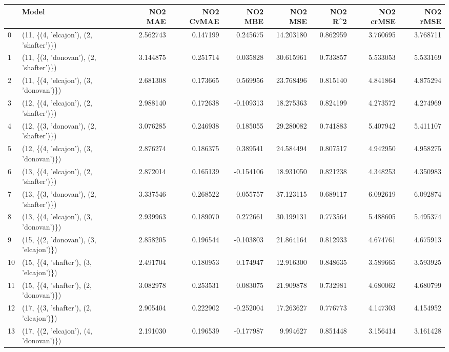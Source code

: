 \begin{tabular}{llrrrrrrr}
\toprule
{} &                                   Model &   NO2 MAE &  NO2 CvMAE &   NO2 MBE &    NO2 MSE &   NO2 R\textasciicircum2 &  NO2 crMSE &  NO2 rMSE \\
\midrule
0  &  (11, \{(4, 'elcajon'), (2, 'shafter')\}) &  2.562743 &   0.147199 &  0.245675 &  14.203180 &  0.862959 &   3.760695 &  3.768711 \\
1  &  (11, \{(3, 'donovan'), (2, 'shafter')\}) &  3.144875 &   0.251714 &  0.035828 &  30.615961 &  0.733857 &   5.533053 &  5.533169 \\
2  &  (11, \{(4, 'elcajon'), (3, 'donovan')\}) &  2.681308 &   0.173665 &  0.569956 &  23.768496 &  0.815140 &   4.841864 &  4.875294 \\
3  &  (12, \{(4, 'elcajon'), (2, 'shafter')\}) &  2.988140 &   0.172638 & -0.109313 &  18.275363 &  0.824199 &   4.273572 &  4.274969 \\
4  &  (12, \{(3, 'donovan'), (2, 'shafter')\}) &  3.076285 &   0.246938 &  0.185055 &  29.280082 &  0.741883 &   5.407942 &  5.411107 \\
5  &  (12, \{(4, 'elcajon'), (3, 'donovan')\}) &  2.876274 &   0.186375 &  0.389541 &  24.584494 &  0.807517 &   4.942950 &  4.958275 \\
6  &  (13, \{(4, 'elcajon'), (2, 'shafter')\}) &  2.872014 &   0.165139 & -0.154106 &  18.931050 &  0.821238 &   4.348253 &  4.350983 \\
7  &  (13, \{(3, 'donovan'), (2, 'shafter')\}) &  3.337546 &   0.268522 &  0.055757 &  37.123115 &  0.689117 &   6.092619 &  6.092874 \\
8  &  (13, \{(4, 'elcajon'), (3, 'donovan')\}) &  2.939963 &   0.189070 &  0.272661 &  30.199131 &  0.773564 &   5.488605 &  5.495374 \\
9  &  (15, \{(2, 'donovan'), (3, 'elcajon')\}) &  2.858205 &   0.196544 & -0.103803 &  21.864164 &  0.812933 &   4.674761 &  4.675913 \\
10 &  (15, \{(4, 'shafter'), (3, 'elcajon')\}) &  2.491704 &   0.180953 &  0.174947 &  12.916300 &  0.848635 &   3.589665 &  3.593925 \\
11 &  (15, \{(4, 'shafter'), (2, 'donovan')\}) &  3.082978 &   0.253531 &  0.083075 &  21.909878 &  0.732981 &   4.680062 &  4.680799 \\
12 &  (17, \{(3, 'shafter'), (2, 'elcajon')\}) &  2.905404 &   0.222902 & -0.252004 &  17.263627 &  0.776773 &   4.147303 &  4.154952 \\
13 &  (17, \{(2, 'elcajon'), (4, 'donovan')\}) &  2.191030 &   0.196539 & -0.177987 &   9.994627 &  0.851448 &   3.156414 &  3.161428 \\

\end{tabular}
